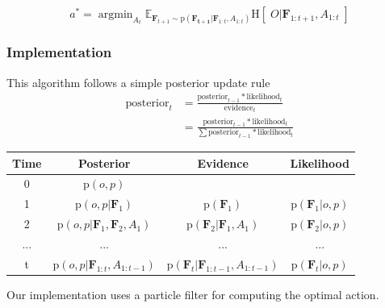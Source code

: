 \documentclass[conference]{IEEEtran}
\newcommand{\prob}[1]{\text{p}(#1)} %
\newcommand{\set}[1]{\mathbf{#1}} %
\DeclareMathOperator*{\argmin}{argmin}
\newcommand{\entropy}[1]{\text{H}\left[\;#1 \; \right]} %
\newcommand{\expectedValue}[2]{\hollow{E}_{#2}#1} %
\newcommand{\hollow}[1]{\mathbb{#1}} %
\begin{document}
        \begin{equation}
            a^* = \argmin_{A_t} \expectedValue{ \entropy{O|\set{F}_{1:t+1},A_{1:t}} }{\set{F}_{t+1} \sim \prob{\set{F_{t+1}}|\set{F}_{1:t},A_{1:t}}}
        \end{equation}

        \subsubsection{Implementation}

        This algorithm follows a simple posterior update rule
        \begin{align}
            \text{posterior}_t &= \frac{\text{posterior}_{t-1}*\text{likelihood}_t}{\text{evidence}_t}\\
            &= \frac{\text{posterior}_{t-1}*\text{likelihood}_t}{\sum \text{posterior}_{t-1}*\text{likelihood}_t}
        \end{align}

        \begin{table}[h]
          \begin{tabular}{c|c|c|c} %
            \hline %
            Time & Posterior & Evidence & Likelihood\\
            [0.5ex] %
            \hline\hline %
            0 & $\prob{o,p}$ & & \\[0.5ex] 
            1 & $\prob{o,p|\set{F}_1}$ & $\prob{\set{F}_1}$ & $\prob{\set{F}_1|o,p}$ \\[0.5ex] 
            2 & $\prob{o,p|\set{F}_1,\set{F}_2,A_1}$ & $\prob{\set{F}_2|\set{F}_1,A_1}$ & $\prob{\set{F}_2|o,p}$ \\
            ...&...&...&...\\[0.5ex] 
            t & $\prob{o,p|\set{F}_{1:t},A_{1:t-1}}$ & $\prob{\set{F}_t|\set{F}_{1:t-1},A_{1:t-1}}$ & $\prob{\set{F}_t|o,p}$
          \end{tabular}
        \end{table}

        Our implementation uses a particle filter for computing the optimal action.

\end{document}
